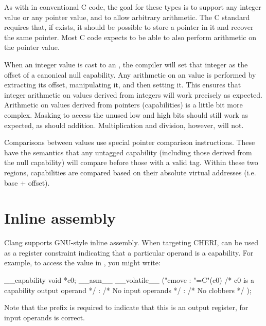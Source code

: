 As with  in conventional C code, the goal for these types is to support any integer value or any pointer value, and to allow arbitrary arithmetic.  The C standard requires that, if  exists, it should be possible to store a pointer in it and recover the same pointer.  Most C code expects to be able to also perform arithmetic on the pointer value.

When an integer value is cast to an , the compiler will set that integer as the offset of a canonical null capability.  Any arithmetic on an  value is performed by extracting its offset, manipulating it, and then setting it.  This ensures that integer arithmetic on  values derived from integers will work precisely as expected.  Arithmetic on values derived from pointers (capabilities) is a little bit more complex.  Masking to access the unused low and high bits should still work as expected, as should addition.  Multiplication and division, however, will not.

Comparisons between  values use special pointer comparison instructions.  These have the semantics that any untagged capability (including those derived from the null capability) will compare before those with a valid tag.  Within these two regions, capabilities are compared based on their absolute virtual addresses (i.e. base + offset).

\section{Inline assembly}

Clang supports GNU-style inline assembly.
When targeting CHERI,  can be used as a register constraint indicating that a particular operand is a capability.
For example, to access the value in , you might write:

\begin{csnippet}
__capability void *c0;
__asm__ __volatile__ ("cmove %
	: "=C"(c0) /* c0 is a capability output operand */
	: /* No input operands */
	: /* No clobbers */
	);
\end{csnippet}

Note that the \ccode{=} prefix is required to indicate that this is an output register, for input operands  is correct.

